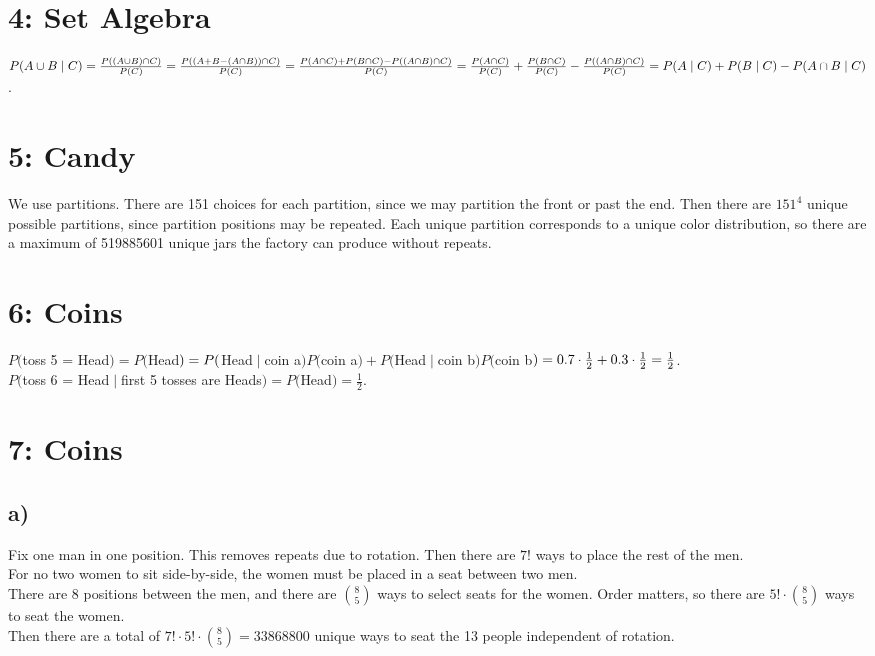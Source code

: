 \documentclass{article}
\begin{document}
\newpage

\section*{4: Set Algebra}
$P(A \cup B \; | \; C)
\\=\frac{P((A \cup B) \cap C)}{P(C)}
\\=\frac{P((A + B - (A \cap B)) \cap C)}{P(C)}
\\=\frac{P(A \cap C) + P(B \cap C) - P((A \cap B) \cap C)}{P(C)}
\\=\frac{P(A \cap C)}{P(C)}
+ \frac{P(B \cap C)}{P(C)}
- \frac{P((A \cap B) \cap C)}{P(C)}
\\=P(A \; | \; C)
+ P(B \; | \; C)
- P(A \cap B \; | \; C)$.

\section*{5: Candy}
We use partitions.
There are 151 choices for each partition, since we may partition
the front or past the end.
Then there are $151^4$ unique possible partitions, since partition positions
may be repeated.
Each unique partition corresponds to a unique color distribution, so there are
a maximum of 519885601 unique jars the factory can produce without repeats.

\section*{6: Coins}
$P($toss 5 = Head$) = P($Head$)
\\= P($Head$ \;|\; $coin a$)P($coin a$) + P($Head$ \;|\; $coin b$)P($coin b$)
\\= 0.7 \cdot \frac{1}{2} + 0.3 \cdot \frac{1}{2}
\\= \frac{1}{2}$.
\\$P($toss 6 = Head$ \;|\; $first 5 tosses are Heads$)
= P($Head$)
= \frac{1}{2}$.

\newpage

\section*{7: Coins}
\subsection*{a)}
Fix one man in one position. This removes repeats due to rotation.
Then there are $7!$ ways to place the rest of the men.
\\For no two women to sit side-by-side, the women must be placed in a seat
between two men.
\\There are 8 positions between the men, and there are $8 \choose 5$ ways to
select seats for the women. Order matters, so there are
$5! \cdot {8 \choose 5}$ ways to seat the women.
\\Then there are a total of $7! \cdot 5! \cdot {8 \choose 5} = 33868800$
unique ways to seat the 13 people independent of rotation.
\end{document}
